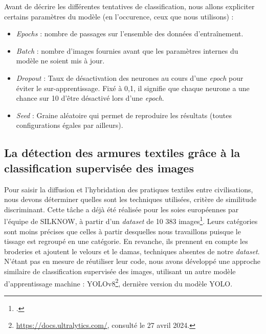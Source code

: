 Avant de décrire les différentes tentatives de classification, nous allons expliciter certains paramètres du modèle (en l'occurence, ceux que nous utilisons) : 
\begin{itemize}
	\item \textit{Epochs} : nombre de passages sur l'ensemble des données d'entraînement.
	\item \textit{Batch} : nombre d'images fournies avant que les paramètres internes du modèle ne soient mis à jour.
	\item \textit{Dropout} : Taux de désactivation des neurones au cours d'une \textit{epoch} pour éviter le sur-apprentissage. Fixé à 0,1, il signifie que chaque neurone a une chance sur 10 d'être désactivé lors d'une \textit{epoch}.
	\item \textit{Seed} : Graine aléatoire qui permet de reproduire les résultats (toutes configurations égales par ailleurs).
\end{itemize}

\subsection{La détection des armures textiles grâce à la classification supervisée des images}
Pour saisir la diffusion et l'hybridation des pratiques textiles entre civilisations, nous devons déterminer quelles sont les techniques utilisées, critère de similitude discriminant. Cette tâche a déjà été réalisée pour les soies européennes par l'équipe de SILKNOW, à partir d'un \textit{dataset} de 10 383 images\footcite[p.~51]{dorozynskiMultiTaskDeepLearning2019}. Leurs catégories sont moins précises que celles à partir desquelles nous travaillons puisque le tissage est regroupé en une catégorie. En revanche, ils prennent en compte les broderies et ajoutent le velours et le damas, techniques absentes de notre \textit{dataset}. N'étant pas en mesure de réutiliser leur code, nous avons développé une approche similaire de classification supervisée des images, utilisant un autre modèle d'apprentissage machine : YOLOv8\footnote{\url{https://docs.ultralytics.com/}, consulté le 27 avril 2024.}, dernière version du modèle YOLO.

